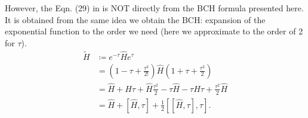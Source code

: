 However, the Eqn. (29) in \cite{feniou2025realspacechemistryquantumcomputers} is NOT directly from the BCH formula presented here. It is obtained from the same idea we obtain the BCH: expansion of the exponential function to the order we need (here we approximate to the order of 2 for $\tau$).
\begin{equation}
    \begin{split}
        \tilde{H} &\coloneqq e^{-\tau}\hat{H}e^{\tau} \\
        &=\left(1-\tau+\frac{\tau^2}{2!}\right)\hat{H}\left(1+\tau+\frac{\tau^2}{2}\right) \\
        &=\hat{H}+\hat{H}\tau+\hat{H}\frac{\tau^2}{2}-\tau\hat{H}-\tau\hat{H}\tau+\frac{\tau^2}{2}\hat{H} \\
        &=\hat{H}+[\hat{H},\tau]+\frac{1}{2}\left[[\hat{H},\tau],\tau\right].
    \end{split}
    \label{eqn:TruncatSecondOrder}
\end{equation}
